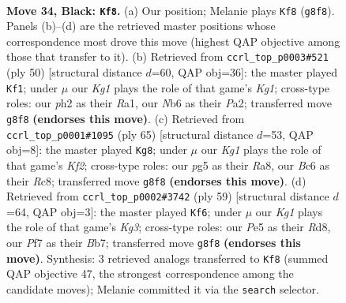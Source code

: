\documentclass[11pt]{article}
\begin{document}
\clearpage

\begin{figure}[p]\centering
\begin{subfigure}{0.46\textwidth}\centering
\resizebox{\linewidth}{!}{%
\newchessgame
\chessboard[
  setfen={r5k1/2r2ppp/nnbN4/p3p1P1/8/1P2P1R1/P3B1PP/RN4K1 b - - 7 34},
  showmover=false,
  pgfstyle=straightmove, color=movearrow, markmove={g8-f8}
]}
\caption{}
\end{subfigure}\hfill
\begin{subfigure}{0.46\textwidth}\centering
\resizebox{\linewidth}{!}{%
\newchessgame
\chessboard[
  setfen={r1r2nk1/5pp1/2p1pn2/4N3/p1P2BP1/8/PP3P2/R2R2K1 w - - 0 26},
  showmover=false,
  pgfstyle=straightmove, color=movearrow, markmove={g1-f1}
]}
\caption{}
\end{subfigure}
\\[4pt]
\begin{subfigure}{0.46\textwidth}\centering
\resizebox{\linewidth}{!}{%
\newchessgame
\chessboard[
  setfen={r1r5/3pnk1p/pB3p2/P1bp2p1/3N2P1/1P5R/1P3P1P/3R2K1 b - - 2 33},
  showmover=false,
  pgfstyle=straightmove, color=movearrow, markmove={f7-g8}
]}
\caption{}
\end{subfigure}\hfill
\begin{subfigure}{0.46\textwidth}\centering
\resizebox{\linewidth}{!}{%
\newchessgame
\chessboard[
  setfen={3rr3/1b4p1/p3n1k1/2p1N2p/p6P/B1P1RP2/6P1/R5K1 b - - 1 30},
  showmover=false,
  pgfstyle=straightmove, color=movearrow, markmove={g6-f6}
]}
\caption{}
\end{subfigure}
\caption{\textbf{Move 34, Black: \texttt{Kf8}.} (a) Our position; Melanie plays \texttt{Kf8} (\texttt{g8f8}). Panels (b)--(d) are the retrieved master positions whose correspondence most drove this move (highest QAP objective among those that transfer to it). (b) Retrieved from \texttt{ccrl\_top\_p0003\#521} (ply 50) [structural distance $d$=60, QAP obj=36]: the master played \texttt{Kf1}; under $\mu$ our \emph{Kg1} plays the role of that game's \emph{Kg1}; cross-type roles: our \emph{p}h2 as their \emph{R}a1, our \emph{N}b6 as their \emph{P}a2; transferred move \texttt{g8f8} \textbf{(endorses this move)}. (c) Retrieved from \texttt{ccrl\_top\_p0001\#1095} (ply 65) [structural distance $d$=53, QAP obj=8]: the master played \texttt{Kg8}; under $\mu$ our \emph{Kg1} plays the role of that game's \emph{Kf2}; cross-type roles: our \emph{p}g5 as their \emph{R}a8, our \emph{B}c6 as their \emph{R}c8; transferred move \texttt{g8f8} \textbf{(endorses this move)}. (d) Retrieved from \texttt{ccrl\_top\_p0002\#3742} (ply 59) [structural distance $d$=64, QAP obj=3]: the master played \texttt{Kf6}; under $\mu$ our \emph{Kg1} plays the role of that game's \emph{Kg3}; cross-type roles: our \emph{P}e5 as their \emph{R}d8, our \emph{P}f7 as their \emph{B}b7; transferred move \texttt{g8f8} \textbf{(endorses this move)}. Synthesis: 3 retrieved analogs transferred to \texttt{Kf8} (summed QAP objective 47, the strongest correspondence among the candidate moves); Melanie committed it via the \texttt{search} selector.}
\label{fig:thought-m67}
\end{figure}
\end{document}
